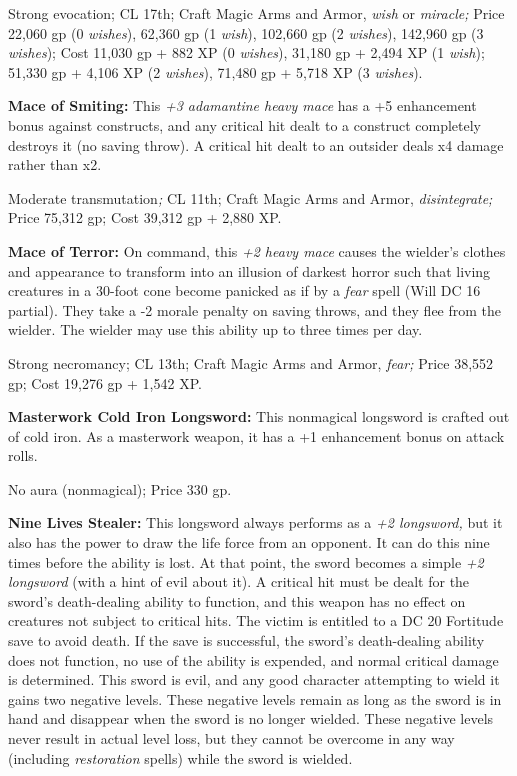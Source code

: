 \documentclass{article}
\begin{document}
Strong evocation; CL 17th; Craft Magic Arms and Armor, \textit{wish }or \textit{miracle; 
}Price 22,060 gp (0 \textit{wishes}), 62,360 gp (1 \textit{wish}), 102,660 gp (2 
\textit{wishes}), 142,960 gp (3 \textit{wishes}); Cost 11,030 gp + 882 XP (0 \textit{wishes}), 
31,180 gp + 2,494 XP (1 \textit{wish}); 51,330 gp + 4,106 XP (2 \textit{wishes}), 
71,480 gp + 5,718 XP (3 \textit{wishes}).

\textbf{Mace of Smiting: }This \textit{+3 adamantine heavy mace }has a +5 enhancement 
bonus against constructs, and any critical hit dealt to a construct completely 
destroys it (no saving throw). A critical hit dealt to an outsider deals x4 damage 
rather than x2.

Moderate transmutation\textit{; }CL 11th; Craft Magic Arms and Armor, \textit{disintegrate; 
}Price 75,312 gp; Cost 39,312 gp + 2,880 XP.

\textbf{Mace of Terror:} On command, this \textit{+2 heavy mace }causes the wielder's 
clothes and appearance to transform into an illusion of darkest horror such that 
living creatures in a 30-foot cone become panicked as if by a \textit{fear }spell 
(Will DC 16 partial). They take a -2 morale penalty on saving throws, and they 
flee from the wielder. The wielder may use this ability up to three times per day. 

Strong necromancy; CL 13th; Craft Magic Arms and Armor, \textit{fear; }Price 38,552 
gp; Cost 19,276 gp + 1,542 XP.

\textbf{Masterwork Cold Iron Longsword:} This nonmagical longsword is crafted out 
of cold iron. As a masterwork weapon, it has a +1 enhancement bonus on attack rolls.

No aura (nonmagical); Price 330 gp.

\textbf{Nine Lives Stealer:} This longsword always performs as a \textit{+2 longsword, 
}but it also has the power to draw the life force from an opponent. It can do this 
nine times before the ability is lost. At that point, the sword becomes a simple 
\textit{+2 longsword }(with a hint of evil about it). A critical hit must be dealt 
for the sword's death-dealing ability to function, and this weapon has no effect 
on creatures not subject to critical hits. The victim is entitled to a DC 20 Fortitude 
save to avoid death. If the save is successful, the sword's death-dealing ability 
does not function, no use of the ability is expended, and normal critical damage 
is determined. This sword is evil, and any good character attempting to wield it 
gains two negative levels. These negative levels remain as long as the sword is 
in hand and disappear when the sword is no longer wielded. These negative levels 
never result in actual level loss, but they cannot be overcome in any way (including 
\textit{restoration }spells) while the sword is wielded.
\end{document}
